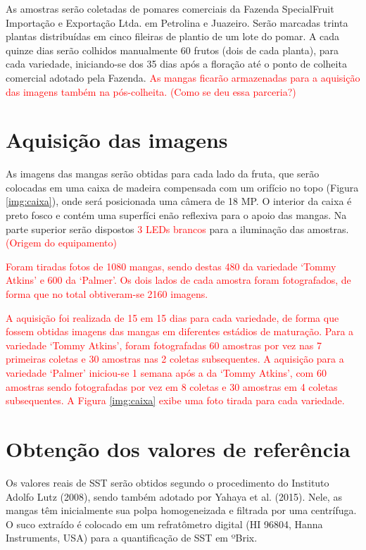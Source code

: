 As amostras serão coletadas de pomares comerciais da Fazenda SpecialFruit Importação e Exportação Ltda. em Petrolina e Juazeiro. Serão marcadas trinta plantas distribuídas em cinco fileiras de plantio de um lote do pomar. A cada quinze dias serão colhidos manualmente 60 frutos (dois de cada planta), para cada variedade, iniciando-se dos 35 dias após a floração até o ponto de colheita comercial adotado pela Fazenda. \textcolor{red}{As mangas ficarão armazenadas para a aquisição das imagens também na pós-colheita. (Como se deu essa parceria?)}

\section{Aquisição das imagens}

As imagens das mangas serão obtidas para cada lado da fruta, que serão colocadas em uma caixa de madeira compensada com um orifício no topo (Figura \ref{img:caixa}), onde será posicionada uma câmera de 18 MP. O interior da caixa é preto fosco e contém uma superfíci enão reflexiva para o apoio das mangas. Na parte superior serão dispostos \textcolor{red}{3 LEDs brancos} para a iluminação das amostras. \textcolor{red}{(Origem do equipamento)}


\textcolor{red}{Foram tiradas fotos de 1080 mangas, sendo destas 480 da variedade ‘Tommy Atkins’ e 600 da ‘Palmer’. Os dois lados de cada amostra foram fotografados, de forma que no total obtiveram-se 2160 imagens.} 

\textcolor{red}{A aquisição foi realizada de 15 em 15 dias para cada variedade, de forma que fossem obtidas imagens das mangas em diferentes estádios de maturação. Para a variedade ‘Tommy Atkins’, foram fotografadas 60 amostras por vez nas 7 primeiras coletas e 30 amostras nas 2 coletas subsequentes. A aquisição para a variedade ‘Palmer’ iniciou-se 1 semana após a da ‘Tommy Atkins’, com 60 amostras sendo fotografadas por  vez em 8 coletas e 30 amostras em 4 coletas subsequentes. A Figura \ref{img:caixa} exibe uma foto tirada para cada variedade.}

\section{Obtenção dos valores de referência}

Os valores reais de SST serão obtidos segundo o procedimento do Instituto Adolfo Lutz (2008), sendo também adotado por Yahaya et al. (2015). Nele, as mangas têm inicialmente sua polpa homogeneizada e filtrada por uma centrífuga. O suco extraído é colocado em um refratômetro digital (HI 96804, Hanna Instruments, USA) para a quantificação de SST em ºBrix. 

